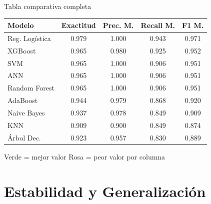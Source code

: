 \documentclass[10pt,aspectratio=169]{beamer}
\begin{document}
\begin{frame}{Tabla comparativa completa}
\begin{center}
\scriptsize
\begin{tabular}{lcccc}
\toprule
\textbf{Modelo} & \textbf{Exactitud} & \textbf{Prec. M.} & \textbf{Recall M.} & \textbf{F1 M.} \\
\midrule
Reg. Logística & \cellcolor{verdemejor}0.979 & \cellcolor{verdemejor}1.000 & \cellcolor{verdemejor}0.943 & \cellcolor{verdemejor}0.971 \\
XGBoost & 0.965 & 0.980 & 0.925 & 0.952 \\
SVM & 0.965 & \cellcolor{verdemejor}1.000 & 0.906 & 0.951 \\
ANN & 0.965 & \cellcolor{verdemejor}1.000 & 0.906 & 0.951 \\
Random Forest & 0.965 & \cellcolor{verdemejor}1.000 & 0.906 & 0.951 \\
AdaBoost & 0.944 & 0.979 & 0.868 & 0.920 \\
Naive Bayes & 0.937 & 0.978 & 0.849 & 0.909 \\
KNN & \cellcolor{rojomenor}0.909 & \cellcolor{rojomenor}0.900 & 0.849 & \cellcolor{rojomenor}0.874 \\
Árbol Dec. & 0.923 & 0.957 & \cellcolor{rojomenor}0.830 & 0.889 \\
\bottomrule
\end{tabular}
\end{center}

\vspace{0.5em}
\begin{center}
\small Verde = mejor valor \hspace{1em} Rosa = peor valor por columna
\end{center}
\end{frame}

\section{Estabilidad y Generalización}
\end{document}

